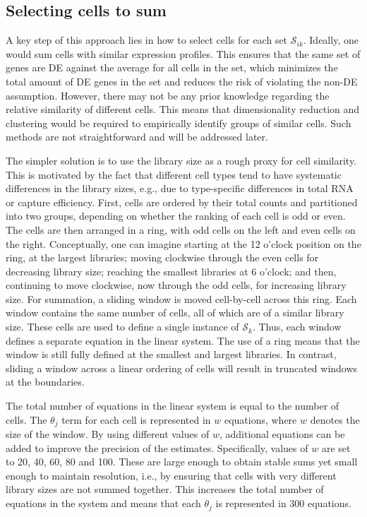 \documentclass{article}
\begin{document}
\subsection{Selecting cells to sum}
A key step of this approach lies in how to select cells for each set $\mathcal{S}_{ik}$.
Ideally, one would sum cells with similar expression profiles.
This ensures that the same set of genes are DE against the average for all cells in the set,
    which minimizes the total amount of DE genes in the set and reduces the risk of violating the non-DE assumption.
However, there may not be any prior knowledge regarding the relative similarity of different cells.
This means that dimensionality reduction and clustering would be required to empirically identify groups of similar cells.
Such methods are not straightforward and will be addressed later.

The simpler solution is to use the library size as a rough proxy for cell similarity.
This is motivated by the fact that different cell types tend to have systematic differences in the library sizes, 
    e.g., due to type-specific differences in total RNA or capture efficiency.
First, cells are ordered by their total counts and partitioned into two groups, depending on whether the ranking of each cell is odd or even.
The cells are then arranged in a ring, with odd cells on the left and even cells on the right.
Conceptually, one can imagine starting at the 12 o'clock position on the ring, at the largest libraries; moving clockwise through the even cells for decreasing library size;
    reaching the smallest libraries at 6 o'clock; and then, continuing to move clockwise, now through the odd cells, for increasing library size.
For summation, a sliding window is moved cell-by-cell across this ring.
Each window contains the same number of cells, all of which are of a similar library size.
These cells are used to define a single instance of $\mathcal{S}_{k}$.
Thus, each window defines a separate equation in the linear system.
The use of a ring means that the window is still fully defined at the smallest and largest libraries.
In contrast, sliding a window across a linear ordering of cells will result in truncated windows at the boundaries.

The total number of equations in the linear system is equal to the number of cells.
The $\theta_j$ term for each cell is represented in $w$ equations, where $w$ denotes the size of the window.
By using different values of $w$, additional equations can be added to improve the precision of the estimates. 
Specifically, values of $w$ are set to 20, 40, 60, 80 and 100.
These are large enough to obtain stable sums yet small enough to maintain resolution, i.e., by ensuring that cells with very different library sizes are not summed together.
This increases the total number of equations in the system and means that each $\theta_j$ is represented in 300 equations. 
\end{document}
